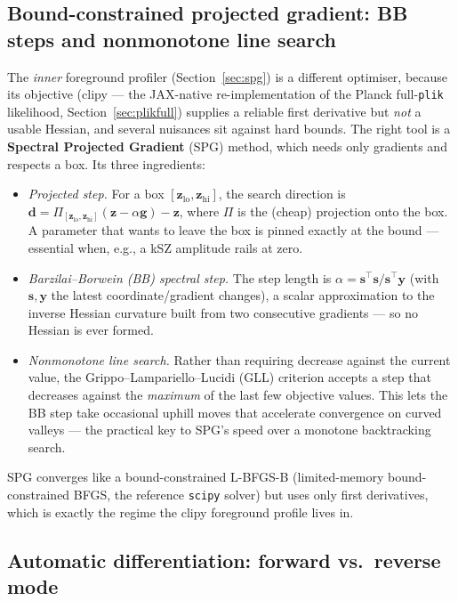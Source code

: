 \documentclass[11pt]{article}
\newcommand{\code}[1]{\texttt{\small #1}}
\begin{document}
\subsection{Bound-constrained projected gradient: BB steps and nonmonotone line search}
\label{sec:spgbg}

The \emph{inner} foreground profiler (Section~\ref{sec:spg}) is a
different optimiser, because its objective (clipy --- the JAX-native
re-implementation of the Planck full-\code{plik} likelihood,
Section~\ref{sec:plikfull}) supplies a reliable first derivative but
\emph{not} a usable Hessian, and several nuisances sit against hard bounds.
The right tool is a \textbf{Spectral Projected
Gradient} (SPG) method, which needs only gradients and respects a box.
Its three ingredients:
\begin{itemize}[leftmargin=1.5em,itemsep=2pt]
\item \emph{Projected step.} For a box $[\bm z_{\mathrm{lo}},\bm
z_{\mathrm{hi}}]$, the search direction is
$\bm d=\Pi_{[\bm z_{\mathrm{lo}},\bm z_{\mathrm{hi}}]}(\bm z-\alpha\bm
g)-\bm z$, where $\Pi$ is the (cheap) projection onto the box. A parameter
that wants to leave the box is pinned exactly at the bound --- essential
when, e.g., a kSZ amplitude rails at zero.
\item \emph{Barzilai--Borwein (BB) spectral step.} The step length is
$\alpha=\bm s^\top\bm s/\bm s^\top\bm y$ (with $\bm s,\bm y$ the latest
coordinate/gradient changes), a scalar approximation to the inverse
Hessian curvature built from two consecutive gradients --- so no Hessian
is ever formed.
\item \emph{Nonmonotone line search.} Rather than requiring decrease
against the current value, the Grippo--Lampariello--Lucidi (GLL) criterion
accepts a step that decreases against the \emph{maximum} of the last few
objective values. This lets the BB step take occasional uphill moves that
accelerate convergence on curved valleys --- the practical key to SPG's
speed over a monotone backtracking search.
\end{itemize}
SPG converges like a bound-constrained L-BFGS-B (limited-memory
bound-constrained BFGS, the reference \code{scipy} solver) but uses only
first derivatives, which is exactly the regime the clipy foreground profile
lives in.

\subsection{Automatic differentiation: forward vs.\ reverse mode}
\label{sec:ad}
\end{document}
